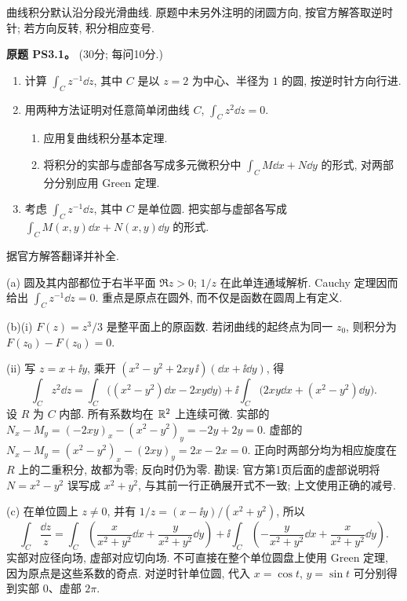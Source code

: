 曲线积分默认沿分段光滑曲线. 原题中未另外注明的闭圆方向, 按官方解答取逆时针; 若方向反转, 积分相应变号.

\begin{exercise}\label{ass:ps3-1}
\textbf{原题 PS3.1。} (30分; 每问10分.)
\begin{enumerate}[label=(\alph*)]
\item 计算 $\int_C z^{-1}\dd z$, 其中 $C$ 是以 $z=2$ 为中心、半径为 $1$ 的圆, 按逆时针方向行进.
\item 用两种方法证明对任意简单闭曲线 $C$, $\int_Cz^2\dd z=0$.
\begin{enumerate}[label=(\roman*)]
\item 应用复曲线积分基本定理.
\item 将积分的实部与虚部各写成多元微积分中 $\int_C M\dd x+N\dd y$ 的形式, 对两部分分别应用 Green 定理.
\end{enumerate}
\item 考虑 $\int_Cz^{-1}\dd z$, 其中 $C$ 是单位圆. 把实部与虚部各写成 $\int_C M(x,y)\dd x+N(x,y)\dd y$ 的形式.
\end{enumerate}
\end{exercise}
\begin{solution}
据官方解答翻译并补全.

(a) 圆及其内部都位于右半平面 $\Re z>0$; $1/z$ 在此单连通域解析. Cauchy 定理因而给出 $\int_Cz^{-1}\dd z=0$. 重点是原点在圆外, 而不仅是函数在圆周上有定义.

(b)(i) $F(z)=z^3/3$ 是整平面上的原函数. 若闭曲线的起终点为同一 $z_0$, 则积分为 $F(z_0)-F(z_0)=0$.

(ii) 写 $z=x+\ii y$, 乘开 $(x^2-y^2+2xy\,\ii)(\dd x+\ii\dd y)$, 得
\[
 \int_Cz^2\dd z
 =\int_C\bigl((x^2-y^2)\dd x-2xy\dd y\bigr)
 +\ii\int_C\bigl(2xy\dd x+(x^2-y^2)\dd y\bigr).
\]
设 $R$ 为 $C$ 内部. 所有系数均在 $\mathbb R^2$ 上连续可微.
实部的 $N_x-M_y=(-2xy)_x-(x^2-y^2)_y=-2y+2y=0$.
虚部的 $N_x-M_y=(x^2-y^2)_x-(2xy)_y=2x-2x=0$.
正向时两部分均为相应旋度在 $R$ 上的二重积分, 故都为零; 反向时仍为零.
勘误: 官方第1页后面的虚部说明将 $N=x^2-y^2$ 误写成 $x^2+y^2$, 与其前一行正确展开式不一致; 上文使用正确的减号.

(c) 在单位圆上 $z\ne0$, 并有 $1/z=(x-\ii y)/(x^2+y^2)$, 所以
\[
 \int_C\frac{\dd z}{z}
 =\int_C\left(\frac{x}{x^2+y^2}\dd x+
                 \frac{y}{x^2+y^2}\dd y\right)
 +\ii\int_C\left(-\frac{y}{x^2+y^2}\dd x+
                  \frac{x}{x^2+y^2}\dd y\right).
\]
实部对应径向场, 虚部对应切向场. 不可直接在整个单位圆盘上使用 Green 定理, 因为原点是这些系数的奇点. 对逆时针单位圆, 代入 $x=\cos t$, $y=\sin t$ 可分别得到实部 $0$、虚部 $2\pi$.
\end{solution}

